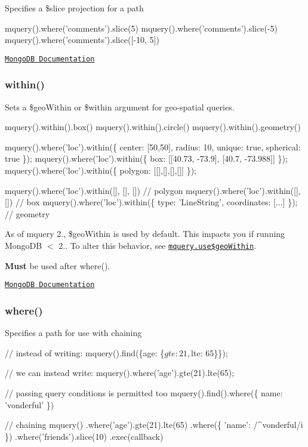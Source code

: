 Specifies a {\ttfamily \$slice} projection for a {\ttfamily path}


\begin{DoxyCode}
mquery().where('comments').slice(5)
mquery().where('comments').slice(-5)
mquery().where('comments').slice([-10, 5])
\end{DoxyCode}


\href{http://docs.mongodb.org/manual/reference/projection/slice/}{\tt Mongo\+DB Documentation}

\subsubsection*{within()}

Sets a {\ttfamily \$geo\+Within} or {\ttfamily \$within} argument for geo-\/spatial queries.


\begin{DoxyCode}
mquery().within().box()
mquery().within().circle()
mquery().within().geometry()

mquery().where('loc').within(\{ center: [50,50], radius: 10, unique: true, spherical: true \});
mquery().where('loc').within(\{ box: [[40.73, -73.9], [40.7, -73.988]] \});
mquery().where('loc').within(\{ polygon: [[],[],[],[]] \});

mquery().where('loc').within([], [], []) // polygon
mquery().where('loc').within([], []) // box
mquery().where('loc').within(\{ type: 'LineString', coordinates: [...] \}); // geometry
\end{DoxyCode}


As of mquery 2., {\ttfamily \$geo\+Within} is used by default. This impacts you if running Mongo\+DB $<$ 2.. To alter this behavior, see \href{#mqueryusegeowithin}{\tt mquery.\+use\$geo\+Within}.

{\bfseries Must} be used after {\ttfamily where()}.

\href{http://docs.mongodb.org/manual/reference/operator/geoWithin/}{\tt Mongo\+DB Documentation}

\subsubsection*{where()}

Specifies a {\ttfamily path} for use with chaining


\begin{DoxyCode}
// instead of writing:
mquery().find(\{age: \{$gte: 21, $lte: 65\}\});

// we can instead write:
mquery().where('age').gte(21).lte(65);

// passing query conditions is permitted too
mquery().find().where(\{ name: 'vonderful' \})

// chaining
mquery()
.where('age').gte(21).lte(65)
.where(\{ 'name': /^vonderful/i \})
.where('friends').slice(10)
.exec(callback)
\end{DoxyCode}


